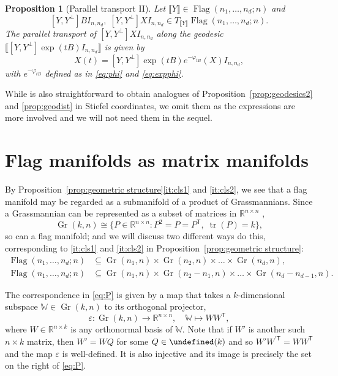 \documentclass[11pt,reqno]{amsart}%
\newtheorem{proposition}[theorem]{Proposition}
\theoremstyle{definition}
\theoremstyle{remark}
\newcommand{\tp}{{\scriptscriptstyle\mathsf{T}}}
\newcommand{\lb}{\llbracket}
\newcommand{\rb}{\rrbracket}
\let\O\undefined
\DeclareMathOperator{\Gr}{Gr}
\DeclareMathOperator{\Flag}{Flag}
\DeclareMathOperator{\O}{O}
\DeclareMathOperator{\tr}{tr}
\begin{document}
\begin{proposition}[Parallel transport II]\label{prop:pt2}
Let $\lb Y \rb \in \Flag(n_1,\dots,n_d;n)$ and
\[
[Y,Y^{\perp}] B I_{n,n_d}, \; [Y,Y^{\perp}] X I_{n,n_d} \in T_{\lb Y \rb} \Flag(n_1,\dots,n_d;n).
\]
The parallel transport of $[Y,Y^{\perp}] X I_{n,n_d}$ along the geodesic $\lb [Y,Y^\perp] \exp (tB)I_{n,n_d}  \rb $ is given by
\begin{equation}\label{eq:pt2}
X(t) = [Y,Y^\perp]  \exp(tB)  e^{-\varphi_{tB}} ( X ) I_{n,n_d},
\end{equation}
with $e^{-\varphi_{tB}}$ defined as in \eqref{eq:phi} and \eqref{eq:expphi}.
\end{proposition}
While is also straightforward to obtain analogues of Proposition~\ref{prop:geodesics2} and \ref{prop:geodist} in Stiefel coordinates, we omit them as the expressions are more involved and we will not need them in the sequel.


\section{Flag manifolds as matrix manifolds}\label{sec:mfld}

By Proposition~\ref{prop:geometric structure}\eqref{it:cls1} and \eqref{it:cls2}, we see that a flag manifold may be regarded as a submanifold of a product of Grassmannians. Since a Grassmannian can be represented as a subset of matrices in $\mathbb{R}^{n\times n}$ \cite[Example~1.2.20]{Nicolaescu},
\begin{equation}\label{eq:P}
\Gr(k,n) \cong \{P\in \mathbb{R}^{n\times n}: P^2 = P = P^\tp,\; \tr(P) = k\},
\end{equation}
so can a flag manifold; and we will discuss two different ways do this, corresponding to \eqref{it:cls1} and \eqref{it:cls2} in Proposition~\ref{prop:geometric structure}:
\begin{align*}
\Flag(n_1,\dots,n_d;n) &\subseteq \Gr(n_1,n)\times  \Gr(n_2,n) \times \dots \times \Gr(n_d,n),\\
\Flag(n_1,\dots,n_d;n) &\subseteq \Gr(n_1,n)\times  \Gr(n_2-n_1,n) \times \dots \times \Gr(n_d-n_{d-1},n).
\end{align*}


The correspondence in \eqref{eq:P} is given by a map that takes a $k$-dimensional subspace $\mathbb{W}\in \Gr(k,n)$ to its orthogonal projector,
\begin{equation}\label{eq:epsGr}
\varepsilon: \Gr(k,n) \to \mathbb{R}^{n\times n}, \quad \mathbb{W} \mapsto W W^\tp,
\end{equation}
where $W \in \mathbb{R}^{n \times k}$ is any orthonormal basis of $\mathbb{W}$. Note that if $W'$ is another such $n \times k$ matrix, then $W' = W Q$ for some $Q\in \O(k)$ and so $W'W^{\prime\tp} =WW^\tp$ and the map $\varepsilon$ is well-defined. It is also injective and its image is precisely the set on the right of \eqref{eq:P}.
\end{document}
